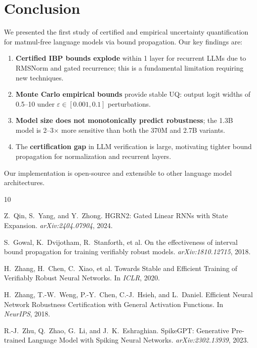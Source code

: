 \documentclass[11pt]{article}
\begin{document}
\section{Conclusion}

We presented the first study of certified and empirical uncertainty quantification for matmul-free language models via bound propagation. Our key findings are:

\begin{enumerate}[nosep]
    \item \textbf{Certified IBP bounds explode} within 1 layer for recurrent LLMs due to RMSNorm and gated recurrence; this is a fundamental limitation requiring new techniques.
    \item \textbf{Monte Carlo empirical bounds} provide stable UQ: output logit widths of 0.5--10 under $\varepsilon \in [0.001, 0.1]$ perturbations.
    \item \textbf{Model size does not monotonically predict robustness}; the 1.3B model is 2--3$\times$ more sensitive than both the 370M and 2.7B variants.
    \item The \textbf{certification gap} in LLM verification is large, motivating tighter bound propagation for normalization and recurrent layers.
\end{enumerate}

Our implementation is open-source and extensible to other language model architectures.

\begin{thebibliography}{10}

Z.~Qin, S.~Yang, and Y.~Zhong.
\newblock HGRN2: Gated Linear RNNs with State Expansion.
\newblock \emph{arXiv:2404.07904}, 2024.

S.~Gowal, K.~Dvijotham, R.~Stanforth, et al.
\newblock On the effectiveness of interval bound propagation for training verifiably robust models.
\newblock \emph{arXiv:1810.12715}, 2018.

H.~Zhang, H.~Chen, C.~Xiao, et al.
\newblock Towards Stable and Efficient Training of Verifiably Robust Neural Networks.
\newblock In \emph{ICLR}, 2020.

H.~Zhang, T.-W.~Weng, P.-Y.~Chen, C.-J.~Hsieh, and L.~Daniel.
\newblock Efficient Neural Network Robustness Certification with General Activation Functions.
\newblock In \emph{NeurIPS}, 2018.

R.-J.~Zhu, Q.~Zhao, G.~Li, and J.~K.~Eshraghian.
\newblock SpikeGPT: Generative Pre-trained Language Model with Spiking Neural Networks.
\newblock \emph{arXiv:2302.13939}, 2023.

\end{thebibliography}
\end{document}
